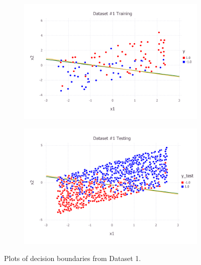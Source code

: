 \begin{figure}[h!]
\centering
    \begin{subfigure}[b]{0.45\textwidth}
	\includegraphics[scale=0.6]{figures/train_final_1.pdf}
    \end{subfigure}
    \quad
    \begin{subfigure}[b]{0.45\textwidth}
	\includegraphics[scale=0.6]{figures/test_final_1.pdf}
	\end{subfigure}
    \caption{Plots of decision boundaries from Dataset 1.}  \label{fig:dataset_1}  
\end{figure}
